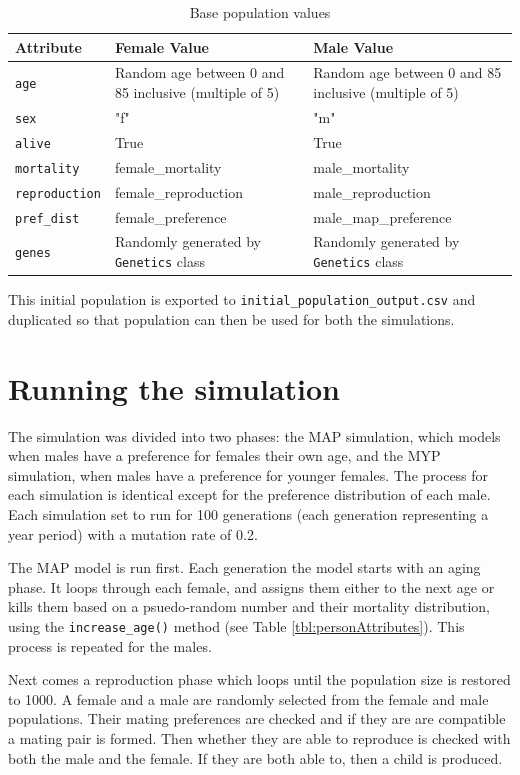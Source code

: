 \documentclass[authoryearcitations]{UoYCSproject}
\begin{document}
\begin{table}[h]
\caption{Base population values}
\label{tbl:basePopulationValues}
\begin{tabular}{m{} m{} m{}}
\textbf{Attribute} & \textbf{Female Value} & \textbf{Male Value} \\\hline
\texttt{age} & Random age between 0 and 85 inclusive (multiple of 5) & Random age between 0 and 85 inclusive (multiple of 5) \\\hline
\texttt{sex} & "f" & "m" \\\hline
\texttt{alive} & True & True \\\hline
\texttt{mortality} & female\_mortality & male\_mortality \\\hline
\texttt{reproduction} & female\_reproduction & male\_reproduction \\\hline
\texttt{pref\_dist} & female\_preference & male\_map\_preference \\\hline 
\texttt{genes} & Randomly generated by \texttt{Genetics} class & Randomly generated by \texttt{Genetics} class
\end{tabular}
\end{table}

This initial population is exported to \texttt{initial\_population\_output.csv} and duplicated so that population can then be used for both the simulations.


\newpage
\section{Running the simulation}
The simulation was divided into two phases: the MAP simulation, which models when males have a preference for females their own age, and the MYP simulation, when males have a preference for younger females. The process for each simulation is identical except for the preference distribution of each male. Each simulation set to run for 100 generations (each generation representing a year period) with a mutation rate of 0.2.

The MAP model is run first. Each generation the model starts with an aging phase. It loops through each female, and assigns them either to the next age or kills them based on a psuedo-random number and their mortality distribution, using the \texttt{increase\_age()} method (see Table \ref{tbl:personAttributes}). This process is repeated for the males.

Next comes a reproduction phase which loops until the population size is restored to 1000. A female and a male are randomly selected from the female and male populations. Their mating preferences are checked and if they are are compatible a mating pair is formed. Then whether they are able to reproduce is checked with both the male and the female. If they are both able to, then a child is produced.
\end{document}

